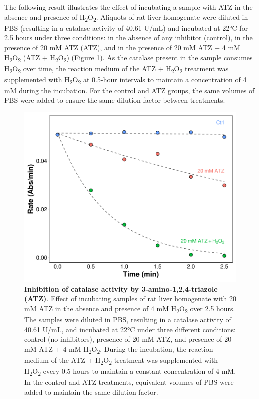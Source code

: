 \documentclass[
  9pt,
  american,
  a5paper,
  extrafontsizes,onecolumn,openright
  ]{memoir}
\begin{document}
The following result illustrates the effect of incubating a sample with ATZ in the absence and presence of H\textsubscript{2}O\textsubscript{2}. Aliquots of rat liver homogenate were diluted in PBS (resulting in a catalase activity of 40.61 U/mL) and incubated at 22°C for 2.5 hours under three conditions: in the absence of any inhibitor (control), in the presence of 20 mM ATZ (ATZ), and in the presence of 20 mM ATZ + 4 mM H\textsubscript{2}O\textsubscript{2} (ATZ + H\textsubscript{2}O\textsubscript{2}) (Figure \ref{fig:cat-fig-inhibitor}). As the catalase present in the sample consumes H\textsubscript{2}O\textsubscript{2} over time, the reaction medium of the ATZ + H\textsubscript{2}O\textsubscript{2} treatment was supplemented with H\textsubscript{2}O\textsubscript{2} at 0.5-hour intervals to maintain a concentration of 4 mM during the incubation. For the control and ATZ groups, the same volumes of PBS were added to ensure the same dilution factor between treatments.



\scriptsize

\begin{figure}

{\centering \includegraphics[width=0.5\linewidth]{Volume-1_files/figure-latex/cat-fig-inhibitor-1} 

}

\caption{\textbf{Inhibition of catalase activity by 3-amino-1,2,4-triazole (ATZ)}. Effect of incubating samples of rat liver homogenate with 20 mM ATZ in the absence and presence of 4 mM H\textsubscript{2}O\textsubscript{2} over 2.5 hours. The samples were diluted in PBS, resulting in a catalase activity of 40.61 U/mL, and incubated at 22°C under three different conditions: control (no inhibitors), presence of 20 mM ATZ, and presence of 20 mM ATZ + 4 mM H\textsubscript{2}O\textsubscript{2}. During the incubation, the reaction medium of the ATZ + H\textsubscript{2}O\textsubscript{2} treatment was supplemented with H\textsubscript{2}O\textsubscript{2} every 0.5 hours to maintain a constant concentration of 4 mM. In the control and ATZ treatments, equivalent volumes of PBS were added to maintain the same dilution factor.}\label{fig:cat-fig-inhibitor}
\end{figure}
\end{document}
